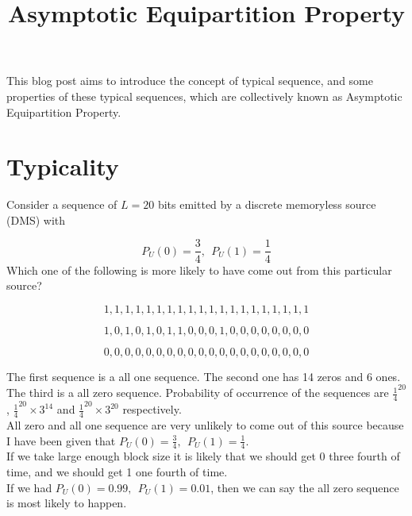 \documentclass[11pt]{article}
\title{\textbf{Asymptotic Equipartition Property}}
\date{}
\begin{document}
\maketitle

This blog post aims to introduce the concept of typical sequence, and some properties of these typical sequences, which are collectively known as Asymptotic Equipartition Property.

\section{Typicality}

Consider a sequence of $L = 20$ bits emitted by a discrete memoryless source (DMS) with

\begin{equation}
P_{U}(0) = \frac{3}{4},\:\: P_{U}(1) = \frac{1}{4}
\end{equation}
Which one of the following is more likely to have come out from this particular
source?

\begin{equation}
1,1,1,1,1,1,1,1,1,1,1,1,1,1,1,1,1,1,1,1
\end{equation}

\begin{equation}
1,0,1,0,1,0,1,1,0,0,0,1,0,0,0,0,0,0,0,0
\end{equation}

\begin{equation}
0,0,0,0,0,0,0,0,0,0,0,0,0,0,0,0,0,0,0,0
\end{equation}

The first sequence is a all one sequence. The second one has 14 zeros and
6 ones. The third is a all zero sequence. Probability of occurrence of the sequences are $\frac{1}{4}^{20}$, $\frac{1}{4}^{20}\times3^{14}$ and $\frac{1}{4}^{20}\times3^{20}$ respectively. 
\\

All zero and all one sequence are very unlikely to come out of this source
because I have been given that $P_{U}(0) = \frac{3}{4},\:\: P_{U}(1) = \frac{1}{4}$.
\\

If we take large enough block size it is likely that we should get 0 three fourth of time, and we should get 1 one fourth of time. 
\\

If we had $P_{U}(0) = 0.99,\:\: P_{U}(1) = 0.01$, then we can say the all zero sequence is most likely to happen.
\\
\end{document}
